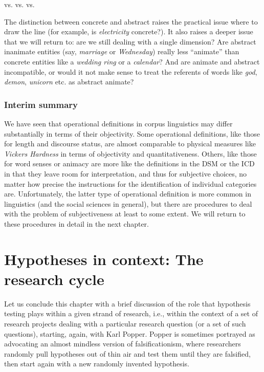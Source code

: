 \begin{exe}
\ex {} vs.  vs.  vs. 
\label{ex:animacythird}
\end{exe}

The distinction between concrete and abstract raises the practical issue where to draw the line (for example, is \textit{electricity} concrete?). It also raises a deeper issue that we will return to: are we still dealing with a single dimension? Are abstract inanimate entities (say, \textit{marriage} or \textit{Wednesday}) really less ``animate'' than concrete entities like a \textit{wedding ring} or a \textit{calendar}? And are animate and abstract incompatible, or would it not make sense to treat the referents of words like \textit{god}, \textit{demon}, \textit{unicorn} etc. as abstract animate? 

\subsubsection{Interim summary}
\label{sec:operationalizingsummary}

We have seen that operational definitions in corpus linguistics may differ substantially in terms of their objectivity. Some operational definitions, like those for length and discourse status, are almost comparable to physical measures like \textit{Vickers Hardness} in terms of objectivity and quantitativeness. Others, like those for word senses or animacy are more like the definitions in the DSM or the ICD in that they leave room for interpretation, and thus for subjective choices, no matter how precise the instructions for the identification of individual categories are. Unfortunately, the latter type of operational definition is more common in linguistics (and the social sciences in general), but there are procedures to deal with the problem of subjectiveness at least to some extent. We will return to these procedures in detail in the next chapter.

\section{Hypotheses in context: The research cycle}
\label{sec:researchcycle}

Let us conclude this chapter with a brief discussion of the role that hypothesis testing plays within a given strand of research, i.e., within the context of a set of research projects dealing with a particular research question (or a set of such questions), starting, again, with Karl Popper. Popper is sometimes portrayed as advocating an almost mindless version of falsificationism, where researchers randomly pull hypotheses out of thin air and test them until they are falsified, then start again with a new randomly invented hypothesis.


